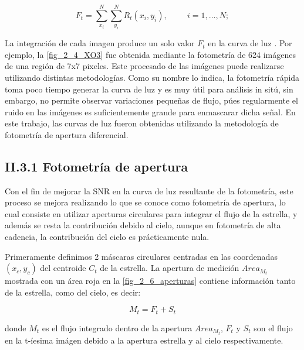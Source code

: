 \begin{equation}
  \displaystyle F_{t} = \sum_{x_{i}}^{N} \sum_{y_{i}}^{N} R_{t}(x_{i},y_{i}),\hspace{1cm}i=1,...,N;
\end{equation}

La integración de cada imagen produce un solo valor $F_{t}$ en la curva de luz \citep{romanishin2006introduction}. Por ejemplo, la \ref{fig_2_4_XO3} fue obtenida mediante la fotometría de 624 imágenes de una región de 7x7 pixeles. Este procesado de las imágenes puede realizarse utilizando distintas metodologías. Como su nombre lo indica, la fotometría rápida toma poco tiempo generar la curva de luz y es muy útil para análisis in sitú, sin embargo, no permite observar variaciones pequeñas de flujo, púes regularmente el ruido en las imágenes es suficientemente grande para enmascarar dicha señal. En este trabajo, las curvas de luz fueron obtenidas utilizando la metodología de fotometría de apertura diferencial.

\subsection*{II.3.1 Fotometría de apertura}

Con el fin de mejorar la SNR en la curva de luz resultante de la fotometría, este proceso se mejora realizando lo que se conoce como fotometría de apertura, lo cual consiste en utilizar aperturas circulares para integrar el flujo de la estrella, y además se resta la contribución debido al cielo, aunque en fotometría de alta cadencia, la contribución del cielo es prácticamente nula.

Primeramente definimos 2 máscaras circulares centradas en las coordenadas $(x_{c},y_{c})$ del centroide $ C_{t} $ de la estrella. La apertura de medición $Area_{M_{t}}$ mostrada con un área roja en la \ref{fig_2_6_aperturas} contiene información tanto de la estrella, como del cielo, es decir:

\begin{equation}
  \displaystyle M_{t} = F_{t}+S_{t}
\end{equation}

donde $M_{t}$ es el flujo integrado dentro de la apertura $Area_{M_{t}}$, $F_{t}$ y $S_{t}$ son el flujo en la t-íesima imágen debido a la apertura estrella y al cielo respectivamente.


